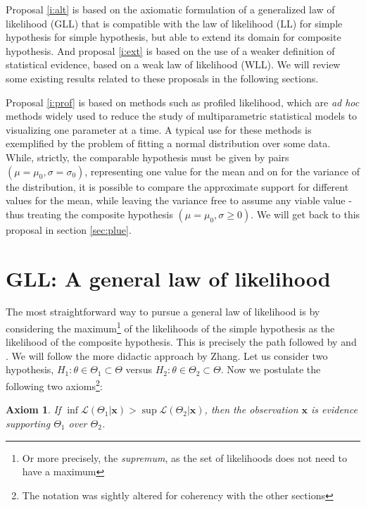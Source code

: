 \documentclass[twoside,12pt,a4paper]{article}
\newtheorem{axiom}{Axiom}[section]
\newcommand{\bu}[1]{\mbox{$\mathbf{#1}$}}
\begin{document}
Proposal \ref{i:alt} is based on the axiomatic formulation of a generalized law of likelihood (GLL) that
is compatible with the law of likelihood (LL) for simple hypothesis for simple hypothesis, but able to extend
its domain for composite hypothesis. And proposal \ref{i:ext} is based on the use of a weaker definition
of statistical evidence, based on a weak law of likelihood (WLL). We will review some existing results related
to these proposals in the following sections.

Proposal \ref{i:prof} is based on methods such as profiled likelihood, which are {\em ad hoc} methods
widely used to reduce the study of multiparametric statistical models to visualizing one parameter at a time.
A typical use for these methods is exemplified by the problem of fitting a normal distribution over some data.
While, strictly, the comparable hypothesis must be given by pairs $(\mu = \mu_0, \sigma = \sigma_0)$,
representing one value for the mean and on for the variance of the distribution, it is possible to
compare the approximate support for different values for the mean, while leaving the variance free to assume
any viable value - thus treating the composite hypothesis $(\mu = \mu_0, \sigma \geq 0)$. We will get back
to this proposal in section \ref{sec:plue}.

\section{GLL: A general law of likelihood}\label{sec:GLL}

The most straightforward way to pursue a general law of likelihood is by considering the maximum\footnote{
Or more precisely, the {\em supremum}, as the set of likelihoods does not need to have a maximum} of the
likelihoods of the simple hypothesis as the likelihood of the composite hypothesis. This is precisely the
path followed by \cite{Zhang09, Zhang13} and \cite{Bickel10}. We will follow the more didactic approach by
Zhang. Let us consider two hypothesis, $H_1 : \theta \in \Theta_1 \subset \Theta$ versus 
$H_2 : \theta \in \Theta_2 \subset \Theta$. Now we postulate the following two axioms\footnote{The notation
was sightly altered for coherency with the other sections}:

\begin{axiom}
	If $\inf \mathcal{L}(\Theta_1 | \bu{x}) > \sup \mathcal{L} (\Theta_2 | \bu{x})$, then the observation
  $\bu{x}$ is evidence supporting $\Theta_1$ over $\Theta_2$.\label{ax:inf}
\end{axiom}
\end{document}
